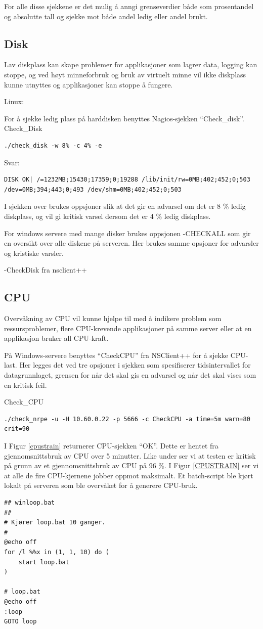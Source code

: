 For alle disse sjekkene er det mulig å anngi grenseverdier både som prosentandel og absolutte tall og sjekke mot både andel ledig eller andel brukt. 
\subsection{Disk}
Lav diskplass kan skape problemer for applikasjoner som lagrer data, logging kan stoppe, og ved høyt minneforbruk og bruk av virtuelt minne vil ikke diskplass kunne utnyttes og applikasjoner kan stoppe å fungere.

Linux:

For å sjekke ledig plass på harddisken benyttes Nagios-sjekken “Check\_disk”. 
Check\_Disk
\begin{lstlisting}
./check_disk -w 8% -c 4% -e
\end{lstlisting}
Svar: 
\begin{lstlisting}
DISK OK| /=1232MB;15430;17359;0;19288 /lib/init/rw=0MB;402;452;0;503 /dev=0MB;394;443;0;493 /dev/shm=0MB;402;452;0;503
\end{lstlisting}
I sjekken over brukes oppsjoner slik at det gir en advarsel om det er 8 \% ledig diskplass, og vil gi kritisk varsel dersom det er 4 \% ledig diskplass.

For windows servere med mange disker brukes oppsjonen -CHECKALL som gir en oversikt over alle diskene på serveren. Her brukes samme opsjoner for advarsler og kristiske varsler.

-CheckDisk fra nsclient++

\subsection{CPU}

Overvåkning av CPU vil kunne hjelpe til med å indikere problem som ressursproblemer, flere CPU-krevende applikasjoner på samme server eller at en applikasjon bruker all CPU-kraft.  

På Windows-servere benyttes “CheckCPU” fra NSClient++ for å sjekke CPU-last. Her legges det ved tre opsjoner i sjekken som spesifiserer tidsintervallet for datagrunnlaget, grensen for når det skal gis en advarsel og når det skal vises som en kritisk feil.

Check\_CPU
\begin{lstlisting}
./check_nrpe -u -H 10.60.0.22 -p 5666 -c CheckCPU -a time=5m warn=80 crit=90
\end{lstlisting}
I Figur \ref{cpustrain} returnerer CPU-sjekken “OK”. Dette er hentet fra gjennomsnittsbruk av CPU over 5 minutter. Like under ser vi at testen er kritisk på grunn av et gjennomsnittsbruk av CPU på 96 \%. I Figur \ref{CPUSTRAIN} ser vi at alle de fire CPU-kjernene jobber oppmot maksimalt. Et batch-script ble kjørt lokalt på serveren som ble overvåket for å generere CPU-bruk.
\begin{lstlisting}
## winloop.bat
##
# Kjører loop.bat 10 ganger.
#
@echo off
for /l %%x in (1, 1, 10) do (
    start loop.bat
)

# loop.bat
@echo off
:loop
GOTO loop
\end{lstlisting}

